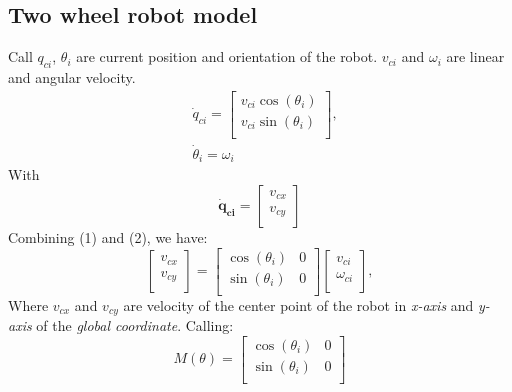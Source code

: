\documentclass[times]{asjcauth}
\begin{document}
\subsection{Two wheel robot model}

Call ${q}_{ci}$, ${\theta}_{i}$ are current position and orientation of the robot. ${v}_{ci}$ and ${\omega}_{i}$ are linear and angular velocity.
\begin{equation}
	\begin{split}
		&\dot{q}_{ci}=\left[
			\begin{array}{c}
			v_{ci}\cos(\theta_{i})\\
			v_{ci}\sin(\theta_{i})\\
			\end{array}
		\right],\\
		&\dot{\theta}_{i}=\omega_{i}
	\end{split}
\end{equation}
With
\begin{equation}
\mathbf{\dot{q}_{ci}}=\left[
		\begin{array}{c}
			v_{cx}\\
			v_{cy}\\
		\end{array}
	\right]
\end{equation}
Combining (1) and (2), we have: 
\begin{equation}
	\left[
		\begin{array}{c}
			v_{cx}\\
			v_{cy}\\
		\end{array}	
	\right]=
	\left[
		\begin{array}{cc}
			\cos(\theta_{i})&{0}\\
			\sin(\theta_{i})&{0}\\
		\end{array}		
	\right]
	\left[
		\begin{array}{c}
			v_{ci}\\
			\omega_{ci}\\
		\end{array}		
	\right],
\end{equation}
Where $v_{cx}$ and $v_{cy}$ are velocity of the center point of the robot in \textit{x-axis} and \textit{y-axis} of the \textit{global coordinate}. 
Calling:
\begin{equation}
{M}(\theta)=\left[\begin{array}{cc}
			\cos(\theta_{i})&{0}\\
			\sin(\theta_{i})&{0}\\
		\end{array}
		\right]
\end{equation}
\end{document}
